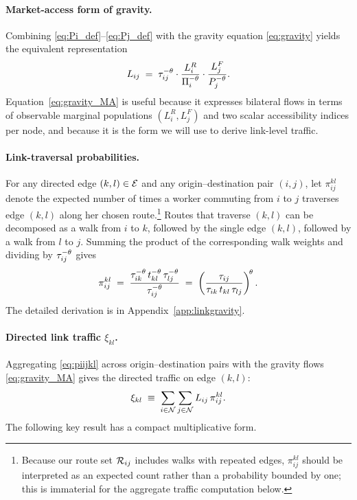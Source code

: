 \paragraph{Market-access form of gravity.}
Combining \eqref{eq:Pi_def}--\eqref{eq:Pj_def} with the gravity
equation \eqref{eq:gravity} yields the equivalent representation
\begin{equation}
  L_{ij}
  \;=\;
  \tau_{ij}^{-\theta}\cdot
  \frac{L_i^R}{\Pi_i^{-\theta}}\cdot
  \frac{L_j^F}{P_j^{-\theta}}.
  \label{eq:gravity_MA}
\end{equation}
Equation~\eqref{eq:gravity_MA} is useful because it expresses
bilateral flows in terms of observable marginal populations
$(L_i^R,L_j^F)$ and two scalar accessibility indices per node, and
because it is the form we will use to derive link-level traffic.

\paragraph{Link-traversal probabilities.}
For any directed edge $(k,l)\in\mathcal E$ and any origin--destination pair
$(i,j)$, let $\pi^{kl}_{ij}$ denote the expected number of times a
worker commuting from $i$ to $j$ traverses edge $(k,l)$ along her
chosen route.\footnote{Because our route set $\mathcal R_{ij}$ includes walks
with repeated edges, $\pi^{kl}_{ij}$ should be interpreted as an
expected count rather than a probability bounded by one; this is
immaterial for the aggregate traffic computation below.}
Routes that traverse $(k,l)$ can be decomposed as a walk from $i$ to
$k$, followed by the single edge $(k,l)$, followed by a walk from
$l$ to $j$.  Summing the product of the corresponding walk weights
and dividing by $\tau_{ij}^{-\theta}$ gives
\begin{equation}
  \pi^{kl}_{ij}
  \;=\;\frac{\tau_{ik}^{-\theta}\,t_{kl}^{-\theta}\,\tau_{lj}^{-\theta}}
            {\tau_{ij}^{-\theta}}
  \;=\;\left(\frac{\tau_{ij}}{\tau_{ik}\,t_{kl}\,\tau_{lj}}\right)^{\!\theta}.
  \label{eq:piijkl}
\end{equation}
The detailed derivation is in Appendix~\ref{app:linkgravity}.

\paragraph{Directed link traffic $\xi_{kl}$.}
Aggregating \eqref{eq:piijkl} across origin--destination pairs with
the gravity flows \eqref{eq:gravity_MA} gives the directed traffic
on edge $(k,l)$:
\begin{equation}
  \xi_{kl}
  \;\equiv\;\sum_{i\in\mathcal N}\sum_{j\in\mathcal N}L_{ij}\,\pi^{kl}_{ij}.
  \label{eq:xi_def}
\end{equation}
The following key result has a compact multiplicative form.

